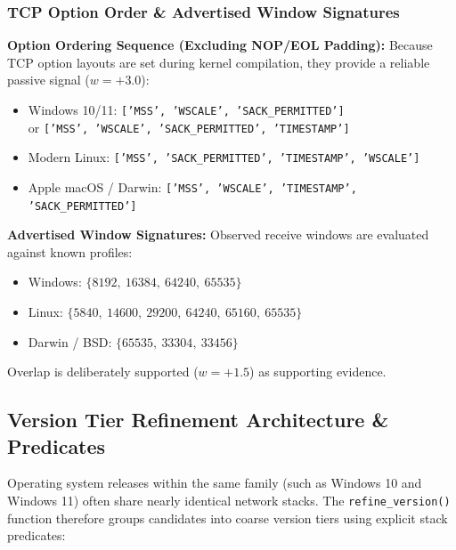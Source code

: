 \subsubsection{TCP Option Order \& Advertised Window Signatures}
\textbf{Option Ordering Sequence (Excluding NOP/EOL Padding):} Because TCP option layouts are set
during kernel compilation, they provide a reliable passive signal ($w = +3.0$):
\begin{itemize}
    \item Windows 10/11: \texttt{['MSS', 'WSCALE', 'SACK\_PERMITTED']}\\
    or \texttt{['MSS', 'WSCALE', 'SACK\_PERMITTED', 'TIMESTAMP']}
    \item Modern Linux: \texttt{['MSS', 'SACK\_PERMITTED', 'TIMESTAMP', 'WSCALE']}
    \item Apple macOS / Darwin: \texttt{['MSS', 'WSCALE', 'TIMESTAMP', 'SACK\_PERMITTED']}
\end{itemize}
\textbf{Advertised Window Signatures:} Observed receive windows are evaluated against known profiles:
\begin{itemize}
    \item Windows: $\{8192, \ 16384, \ 64240, \ 65535\}$
    \item Linux: $\{5840, \ 14600, \ 29200, \ 64240, \ 65160, \ 65535\}$
    \item Darwin / BSD: $\{65535, \ 33304, \ 33456\}$
\end{itemize}
Overlap is deliberately supported ($w = +1.5$) as supporting evidence.

\subsection{Version Tier Refinement Architecture \& Predicates}
Operating system releases within the same family (such as Windows 10 and Windows 11) often share nearly
identical network stacks. The \texttt{refine\_version()} function therefore groups candidates into coarse
version tiers using explicit stack predicates:

